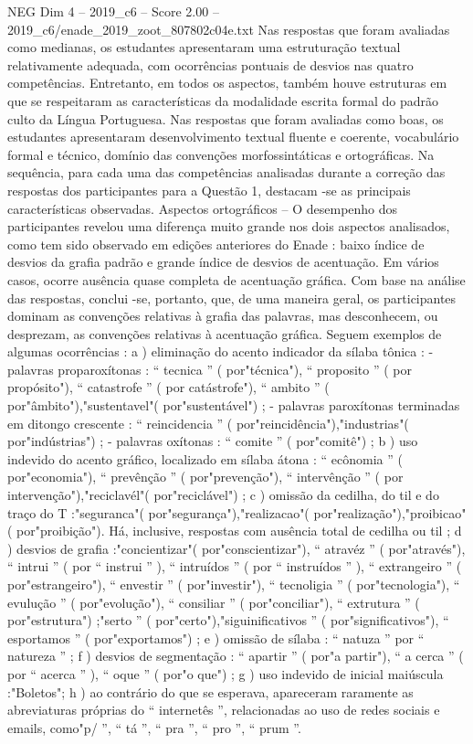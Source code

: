 \begin{textsample}{NEG Dim 4 – 2019\_c6 – Score 2.00 – 2019\_c6/enade\_2019\_zoot\_807802c04e.txt}
Nas respostas que foram avaliadas como medianas, os estudantes apresentaram uma estruturação textual relativamente adequada, com ocorrências pontuais de desvios nas quatro competências.
Entretanto, em todos os aspectos, também houve estruturas em que se respeitaram as características da modalidade escrita formal do padrão culto da Língua Portuguesa.
Nas respostas que foram avaliadas como boas, os estudantes apresentaram desenvolvimento textual fluente e coerente, vocabulário formal e técnico, domínio das convenções morfossintáticas e ortográficas.
Na sequência, para cada uma das competências analisadas durante a correção das respostas dos participantes para a Questão 1, destacam -se as principais características observadas.
Aspectos ortográficos – O desempenho dos participantes revelou uma diferença muito grande nos dois aspectos analisados, como tem sido observado em edições anteriores do Enade : baixo índice de desvios da grafia padrão e grande índice de desvios de acentuação.
Em vários casos, ocorre ausência quase completa de acentuação gráfica.
Com base na análise das respostas, conclui -se, portanto, que, de uma maneira geral, os participantes dominam as convenções relativas à grafia das palavras, mas desconhecem, ou desprezam, as convenções relativas à acentuação gráfica.
Seguem exemplos de algumas ocorrências : a ) eliminação do acento indicador da sílaba tônica : - palavras proparoxítonas : “ tecnica ” ( por"técnica"), “ proposito ” ( por propósito"), “ catastrofe ” ( por catástrofe"), “ ambito ” ( por"âmbito"),"sustentavel"( por"sustentável") ; - palavras paroxítonas terminadas em ditongo crescente : “ reincidencia ” ( por"reincidência"),"industrias"( por"indústrias") ; - palavras oxítonas : “ comite ” ( por"comitê") ; b ) uso indevido do acento gráfico, localizado em sílaba átona : “ ecônomia ” ( por"economia"), “ prevênção ” ( por"prevenção"), “ intervênção ” ( por intervenção"),"reciclavél"( por"reciclável") ; c ) omissão da cedilha, do til e do traço do T :"seguranca"( por"segurança"),"realizacao"( por"realização"),"proibicao"( por"proibição").
Há, inclusive, respostas com ausência total de cedilha ou til ; d ) desvios de grafia :"concientizar"( por"conscientizar"), “ atravéz ” ( por"através"), “ intrui ” ( por “ instrui ” ), “ intruídos ” ( por “ instruídos ” ), “ extrangeiro ” ( por"estrangeiro"), “ envestir ” ( por"investir"), “ tecnoligia ” ( por"tecnologia"), “ evulução ” ( por"evolução"), “ consiliar ” ( por"conciliar"), “ extrutura ” ( por"estrutura") ;"serto ” ( por"certo"),"siguinificativos ” ( por"significativos"), “ esportamos ” ( por"exportamos") ; e ) omissão de sílaba : “ natuza ” por “ natureza ” ; f ) desvios de segmentação : “ apartir ” ( por"a partir"), “ a cerca ” ( por “ acerca ” ), “ oque ” ( por"o que") ; g ) uso indevido de inicial maiúscula :"Boletos"; h ) ao contrário do que se esperava, apareceram raramente as abreviaturas próprias do “ internetês ”, relacionadas ao uso de redes sociais e emails, como"p/ ”, “ tá ”, “ pra ”, “ pro ”, “ prum ”.

\end{textsample}

